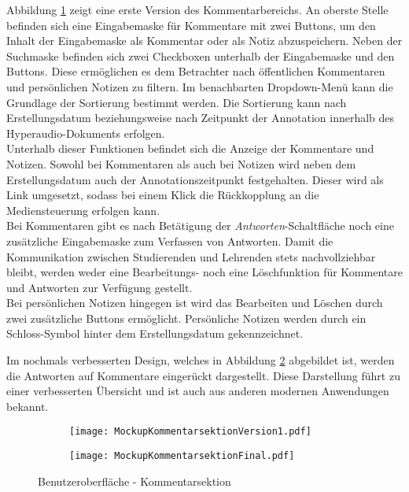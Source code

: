Abbildung \ref{fig:MockupKommentarsektionVersion1} zeigt eine erste Version des Kommentarbereichs. An oberste Stelle befinden sich eine Eingabemaske für Kommentare mit zwei Buttons, um den Inhalt der Eingabemaske als Kommentar oder als Notiz abzuspeichern. Neben der Suchmaske befinden sich zwei Checkboxen unterhalb der Eingabemaske und den Buttons. Diese ermöglichen es dem Betrachter nach öffentlichen Kommentaren und persönlichen Notizen zu filtern. Im benachbarten Dropdown-Menü kann die Grundlage der Sortierung bestimmt werden. Die Sortierung kann nach Erstellungsdatum beziehungsweise nach Zeitpunkt der Annotation innerhalb des Hyperaudio-Dokuments erfolgen.\\
Unterhalb dieser Funktionen befindet sich die Anzeige der Kommentare und Notizen. Sowohl bei Kommentaren als auch bei Notizen wird neben dem Erstellungsdatum auch der Annotationszeitpunkt festgehalten. Dieser wird als Link umgesetzt, sodass bei einem Klick die Rückkopplung an die Mediensteuerung erfolgen kann.\\
Bei Kommentaren gibt es nach Betätigung der \textit{Antworten}-Schaltfläche noch eine zusätzliche Eingabemaske zum Verfassen von Antworten. Damit die Kommunikation zwischen Studierenden und Lehrenden stets nachvollziehbar bleibt, werden weder eine Bearbeitungs- noch eine Löschfunktion für Kommentare und Antworten zur Verfügung gestellt.\\
Bei persönlichen Notizen hingegen ist wird das Bearbeiten und Löschen durch zwei zusätzliche Buttons ermöglicht. Persönliche Notizen werden durch ein Schloss-Symbol hinter dem Erstellungsdatum gekennzeichnet.

Im nochmals verbesserten Design, welches in Abbildung \ref{fig:MockupKommentarsektionFinal} abgebildet ist, werden die Antworten auf Kommentare eingerückt dargestellt. Diese Darstellung führt zu einer verbesserten Übersicht und ist auch aus anderen modernen Anwendungen bekannt.

\begin{figure}[h!]
\begin{subfigure}[c]{\textwidth}
\texttt{[image: MockupKommentarsektionVersion1.pdf]}
\label{fig:MockupKommentarsektionVersion1}
\end{subfigure}
\par\bigskip
\begin{subfigure}[c]{\textwidth}
\texttt{[image: MockupKommentarsektionFinal.pdf]}
\label{fig:MockupKommentarsektionFinal}
\end{subfigure}
\caption{Benutzeroberfläche - Kommentarsektion}
\label{fig:MockupKommentarsektion}
\end{figure}



